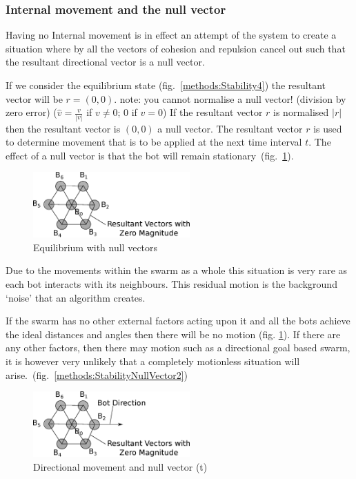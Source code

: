\documentclass[10pt,journal,letterpaper,twoside]{IEEEtran}
\newcommand{\Stability}{Internal movement}
\newcommand{\Fig}{fig.}
\begin{document}
\subsubsection{\Stability{} and the null vector}\label{Section:StabilityNullVector}

Having no \Stability{} is in effect an attempt of the system to create a situation where by all the vectors of cohesion and repulsion cancel out such that the resultant directional vector is a null vector.

If we consider the equilibrium state (\Fig{}~\ref{methods:Stability4}) the resultant vector will be $r = (0,0)$. note: you cannot normalise a null vector! (division by zero error) ($\hat{v} = \frac{v}{|v|}$ if $v\neq0$; $0$ if $v=0$) If the resultant vector $r$ is normalised $|r|$ then the resultant vector is $(0,0)$ a null vector. The resultant vector $r$ is used to determine movement that is to be applied at the next time interval $t$. The effect of a null vector is that the bot will remain stationary~(\Fig{}~\ref{methods:StabilityNullVector}).

\begin{figure}[H]
\begin{center}
\includegraphics[width=6cm]{figures/StabilityNullVector}
\end{center}
\caption{Equilibrium with null vectors} \label{methods:StabilityNullVector}
\end{figure}

Due to the movements within the swarm as a whole this situation is very rare as each bot interacts with its neighbours. This residual motion is the background `noise' that an algorithm creates.

If the swarm has no other external factors acting upon it and all the bots achieve the ideal distances and angles then there will be no motion (\Fig{} \ref{methods:StabilityNullVector}). If there are any other factors, then there may motion such as a directional goal based swarm, it is however very unlikely that a completely motionless situation will arise.~(\Fig{}~\ref{methods:StabilityNullVector2})

\begin{figure}[H]
\begin{center}
\includegraphics[width=6cm]{figures/StabilityNullVector3}
\end{center}
\caption{Directional movement and null vector (t)} \label{methods:StabilityNullVector3}
\end{figure}
\end{document}
